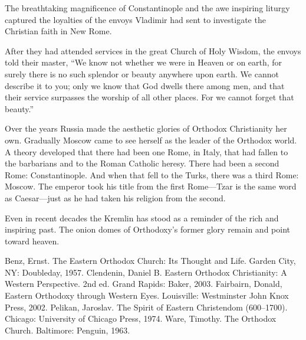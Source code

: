 The breathtaking magnificence of Constantinople and the awe inspiring liturgy captured the loyalties
of the envoys Vladimir had sent to investigate the Christian faith in New Rome.

After they had attended services in the great Church of Holy Wisdom, the envoys told their master,
“We know not whether we were in Heaven or on earth, for surely there is no such splendor or beauty
anywhere upon earth. We cannot describe it to you; only we know that God dwells there among men, and
that their service surpasses the worship of all other places. For we cannot forget that beauty.”

Over the years Russia made the aesthetic glories of Orthodox Christianity her own. Gradually Moscow
came to see herself as the leader of the Orthodox world. A theory developed that there had been one
Rome, in Italy, that had fallen to the barbarians and to the Roman Catholic heresy. There had been a
second Rome: Constantinople. And when that fell to the Turks, there was a third Rome: Moscow. The
emperor took his title from the first Rome—Tzar is the same word as Caesar—just as he had taken his
religion from the second.

Even in recent decades the Kremlin has stood as a reminder of the rich and inspiring past. The onion
domes of Orthodoxy’s former glory remain and point toward heaven.

\begin{readinglist}
\entry Benz, Ernst. The Eastern Orthodox Church: Its Thought and Life. Garden City, NY: Doubleday,
  1957.
\entry Clendenin, Daniel B. Eastern Orthodox Christianity: A Western Perspective. 2nd ed. Grand
  Rapids: Baker, 2003.
\entry Fairbairn, Donald, Eastern Orthodoxy through Western Eyes. Louisville: Westminster John Knox
  Press, 2002.
\entry Pelikan, Jaroslav. The Spirit of Eastern Christendom (600–1700). Chicago: University of
  Chicago Press, 1974.
\entry Ware, Timothy. The Orthodox Church. Baltimore: Penguin, 1963.
\end{readinglist}
